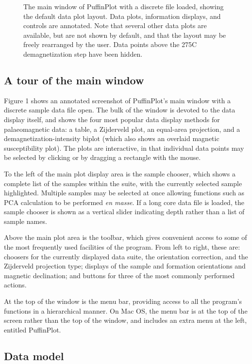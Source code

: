 \documentclass[a4paper,british]{article}
\newcommand{\caps}[1]{\MakeTextUppercase{#1}} %
\begin{document}
\begin{figure}[htbp]
\fi
\caption{\label{fig:screenshot}The main window of PuffinPlot with a discrete
  file loaded, showing the default data plot layout. Data plots, information
  displays, and controls are annotated. Note that several other data plots
  are available, but are not shown by default, and that the layout may be
  freely rearranged by the user. Data points above the 275\textdegree C
  demagnetization step have been hidden.}
\end{figure}

\subsection{A tour of the main window}

Figure 1 shows an annotated screenshot of PuffinPlot's main window with
a discrete sample data file open. The bulk of the window is devoted to
the data display itself, and shows the four most popular data display
methods for palaeomagnetic data: a table, a Zijderveld plot, an
equal-area projection, and a demagnetization-intensity biplot (which
also shows an overlaid magnetic susceptibility plot). The plots are
interactive, in that individual data points may be selected by clicking
or by dragging a rectangle with the mouse.

To the left of the main plot display area is the sample chooser, which shows
a complete list of the samples within the suite, with the currently selected
sample highlighted. Multiple samples may be selected at once allowing
functions such as \caps{pca} calculation to be performed \emph{en masse}. If
a long core data file is loaded, the sample chooser is shown as a vertical
slider indicating depth rather than a list of sample names.

Above the main plot area is the toolbar, which gives convenient access
to some of the most frequently used facilities of the program. From left
to right, these are: choosers for the currently displayed data suite,
the orientation correction, and the Zijderveld projection type; displays
of the sample and formation orientations and magnetic declination; and
buttons for three of the most commonly performed actions.

At the top of the window is the menu bar, providing access to all the
program's functions in a hierarchical manner. On Mac OS, the menu bar is
at the top of the screen rather than the top of the window, and includes
an extra menu at the left, entitled \textsf{PuffinPlot}.

\subsection{Data model}
\end{document}
